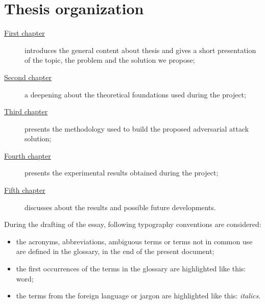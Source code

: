 \section{Thesis organization}\label{sec:thesis-organization}
\begin{description}
    \item[{\hyperref[ch:introduction]{First chapter}}] introduces the general content about thesis and gives a short presentation of the topic, the problem and the solution we propose;

    \item[{\hyperref[ch:background]{Second chapter}}] a deepening about the theoretical foundations used during the project;

    \item[{\hyperref[ch:methodology]{Third chapter}}] presents the methodology used to build the proposed adversarial attack solution;

    \item[{\hyperref[ch:experimental-results]{Fourth chapter}}] presents the experimental results obtained during the project;

    \item[{\hyperref[ch:final-discussions]{Fifth chapter}}] discusses about the results and possible future developments.
\end{description}
During the drafting of the essay, following typography conventions are considered:
\begin{itemize}
    \item the acronyms, abbreviations, ambiguous terms or terms not in common use are defined in the glossary, in the end of the present document;
    \item the first occurrences of the terms in the glossary are highlighted like this: \gls{word};
    \item the terms from the foreign language or jargon are highlighted like this: \emph{italics}.
\end{itemize}